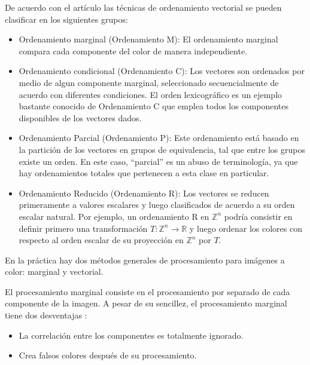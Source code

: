 
De acuerdo con el art\'iculo \cite{barnett1976ordering} las t\'ecnicas de ordenamiento vectorial se pueden clasificar en los siguientes grupos:
\begin{itemize}
\item Ordenamiento marginal (Ordenamiento M): El ordenamiento marginal compara cada componente del color de manera independiente.
\item Ordenamiento condicional (Ordenamiento C): Los vectores son ordenados por medio de algun componente marginal, seleccionado secuencialmente de acuerdo con diferentes condiciones. El orden lexicogr\'afico es un ejemplo bastante conocido de Ordenamiento C que emplea todos los componentes disponibles de los vectores dados.
\item Ordenamiento Parcial (Ordenamiento P): Este ordenamiento est\'a basado en la partici\'on de los vectores en grupos de equivalencia, tal que entre los grupos existe un orden. En este caso, ``parcial'' es un abuso de terminolog\'ia, ya que hay ordenamientos totales que pertenecen a esta clase en particular. 
\item Ordenamiento Reducido (Ordenamiento R): Los vectores se reducen primeramente a valores escalares y luego clasificados de acuerdo a su orden escalar natural. Por ejemplo, un ordenamiento R en $\mathbb{Z}^n$ podr\'ia consistir en definir primero una transformaci\'on $T:\mathbb{Z}^n\rightarrow \mathbb{R}$ y luego ordenar los colores con respecto al orden escalar de su proyecci\'on en $\mathbb{Z}^n$ por $T$.
\end{itemize}

En la pr\'actica hay dos m\'etodos generales de procesamiento para im\'agenes a color: marginal y vectorial.

El procesamiento marginal consiste en el procesamiento por separado de cada componente de la imagen. A pesar de su sencillez, el procesamiento marginal tiene dos desventajas \cite{aptoula2007comparative}: 
\begin{itemize}
    \item La correlaci\'on entre los componentes es totalmente ignorado.
    \item Crea falsos colores despu\'es de su procesamiento.
\end{itemize}

